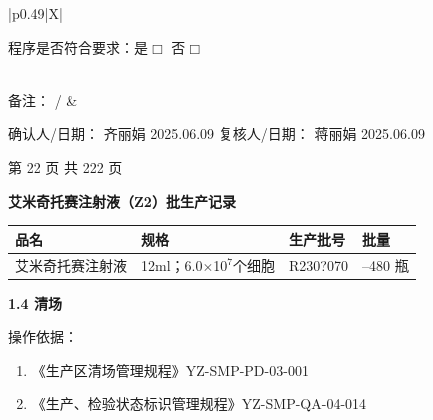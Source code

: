\documentclass[UTF8,10pt,a4paper,fontset=fandol]{ctexart}
\newcommand{\fieldvalue}[1]{#1}
\newcommand{\handwritten}[1]{#1}
\begin{document}
\begin{center}
\begin{tabularx}{\textwidth}{|p{0.49\textwidth}|X|}
\begin{minipage}[t]{\linewidth}
\vspace{8pt}

程序是否符合要求：是\(\Box\) 否\(\Box\)
\end{minipage}
\\
\hline
备注：
\fieldvalue{\handwritten{/}}
&
\\[18pt]
\hline
\end{tabularx}

\vspace{8pt}

\noindent
确认人/日期：
\fieldvalue{\handwritten{齐丽娟}}
\quad
\fieldvalue{\handwritten{2025.06.09}}
\hfill
复核人/日期：
\fieldvalue{\handwritten{蒋丽娟}}
\quad
\fieldvalue{\handwritten{2025.06.09}}

\vfill

\begin{center}
第 22 页 共 222 页
\end{center}
\end{center}

\newpage

\begin{center}
\textbf{艾米奇托赛注射液（Z2）批生产记录}
\end{center}

\begin{tabularx}{\textwidth}{|>{\centering\arraybackslash}X|>{\centering\arraybackslash}X|>{\centering\arraybackslash}X|>{\centering\arraybackslash}X|}
\hline
品名 & 规格 & 生产批号 & 批量 \\
\hline
艾米奇托赛注射液 & 12ml；6.0$\times$10$^{7}$个细胞 &
\fieldvalue{\handwritten{R230?070}} &
200--480 瓶 \\
\hline
\end{tabularx}

\medskip

\textbf{1.4 清场}

操作依据：

\begin{enumerate}
\item 《生产区清场管理规程》\hfill YZ-SMP-PD-03-001
\item 《生产、检验状态标识管理规程》\hfill YZ-SMP-QA-04-014
\end{enumerate}
\end{document}

